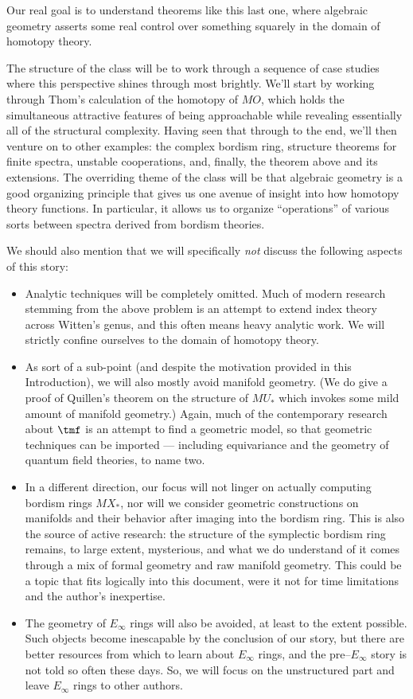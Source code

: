 \noindent Our real goal is to understand theorems like this last one, where algebraic geometry asserts some real control over something squarely in the domain of homotopy theory.

The structure of the class will be to work through a sequence of case studies where this perspective shines through most brightly.  We'll start by working through Thom's calculation of the homotopy of $MO$, which holds the simultaneous attractive features of being approachable while revealing essentially all of the structural complexity.  Having seen that through to the end, we'll then venture on to other examples: the complex bordism ring, structure theorems for finite spectra, unstable cooperations, and, finally, the theorem above and its extensions.  The overriding theme of the class will be that algebraic geometry is a good organizing principle that gives us one avenue of insight into how homotopy theory functions.  In particular, it allows us to organize ``operations'' of various sorts between spectra derived from bordism theories.

We should also mention that we will specifically \emph{not} discuss the following aspects of this story:
\begin{itemize}
\item Analytic techniques will be completely omitted.  Much of modern research stemming from the above problem is an attempt to extend index theory across Witten's genus, and this often means heavy analytic work.  We will strictly confine ourselves to the domain of homotopy theory.
\item As sort of a sub-point (and despite the motivation provided in this Introduction), we will also mostly avoid manifold geometry.  (We do give a proof of Quillen's theorem on the structure of $MU_*$ which invokes some mild amount of manifold geometry.)  Again, much of the contemporary research about $\tmf$ is an attempt to find a geometric model, so that geometric techniques can be imported --- including equivariance and the geometry of quantum field theories, to name two.
\item In a different direction, our focus will not linger on actually computing bordism rings $MX_*$, nor will we consider geometric constructions on manifolds and their behavior after imaging into the bordism ring.  This is also the source of active research: the structure of the symplectic bordism ring remains, to large extent, mysterious, and what we do understand of it comes through a mix of formal geometry and raw manifold geometry.  This could be a topic that fits logically into this document, were it not for time limitations and the author's inexpertise.
\item The geometry of $E_\infty$ rings will also be avoided, at least to the extent possible.  Such objects become inescapable by the conclusion of our story, but there are better resources from which to learn about $E_\infty$ rings, and the pre--$E_\infty$ story is not told so often these days.  So, we will focus on the unstructured part and leave $E_\infty$ rings to other authors.
\end{itemize}

